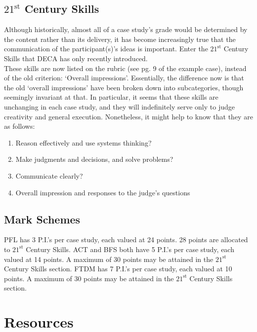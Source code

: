 \documentclass[12pt]{article}
\begin{document}
\subsection{$\textrm{21}^{\textrm{st}}$ Century Skills}

	Although historically, almost all of a case study's grade would be determined by the content rather than its delivery, it has become increasingly true that the communication of the participant(s)'s ideas is important. Enter the $\textrm{21}^{\textrm{st}}$ Century Skills that DECA has only recently introduced. \\
	
	These skills are now listed on the rubric (see pg. 9 of the example case), instead of the old criterion: \lq Overall impressions'. Essentially, the difference now is that the old \lq overall impressions' have been broken down into subcategories, though seemingly invariant at that. In particular, it seems that these skills are unchanging in each case study, and they will indefinitely serve only to judge creativity and general execution. Nonetheless, it might help to know that they are as follows: 
	
\begin{enumerate}
		\item{Reason effectively and use systems thinking?}
		\item{Make judgments and decisions, and
solve problems?}
		\item{Communicate clearly?}
		\item{Overall impression and responses to
the judge’s questions}
\end{enumerate} 
	
\subsection{Mark Schemes}

	PFL has 3 P.I.'s per case study, each valued at 24 points. 28 points are allocated to $\textrm{21}^{\textrm{st}}$  Century Skills. ACT and BFS both have 5 P.I.'s per case study, each valued at 14 points. A maximum of 30 points may be attained in the $\textrm{21}^{\textrm{st}}$ Century Skills section. FTDM has 7 P.I.'s per case study, each valued at 10 points. A maximum of 30 points may be attained in the $\textrm{21}^{\textrm{st}}$ Century Skills section. \\

\section{Resources}
\end{document}
